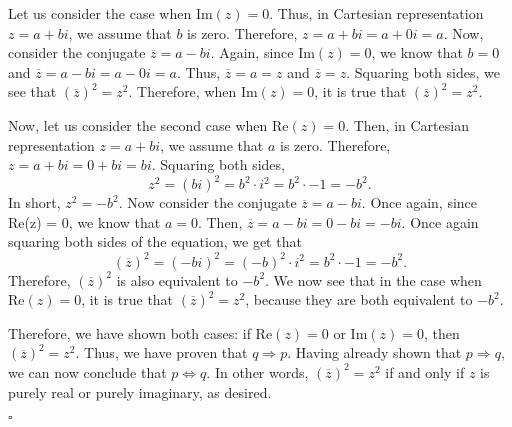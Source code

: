 \documentclass[12pt]{exam}
\begin{document}
\begin{questions}
\begin{parts}
\par
Let us consider the case when $\textrm{Im}(z) = 0$. Thus, in Cartesian representation $z = a + bi$, we assume that $b$ is zero. Therefore, $z = a + bi = a + 0i = a$. Now, consider the conjugate $\overline z = a - bi$. Again, since $\textrm{Im}(z) = 0$, we know that $b=0$ and $\overline z = a - bi = a - 0i = a$. Thus, $\overline z = a = z$ and $\overline z = z$. Squaring both sides, we see that $\left(\overline z\right)^2 = z^2$. Therefore, when $\textrm{Im}(z) = 0$, it is true that $\left(\overline z\right)^2 = z^2$.
\par 
Now, let us consider the second case when $\textrm{Re}(z) = 0$. Then, in Cartesian representation $z = a + bi$, we assume that $a$ is zero. Therefore, $z = a + bi = 0 + bi = bi$. Squaring both sides, 
\begin{equation*}
z^2 = (bi)^2 = b^2 \cdot i^2 = b^2 \cdot -1 = -b^2. 
\end{equation*}
In short, $z^2 = -b^2$. Now consider the conjugate $\overline z = a - bi$. Once again, since Re(z) = 0, we know that $a = 0$. Then, $\overline z = a - bi = 0 - bi = -bi$. Once again squaring both sides of the equation, we get that 
\begin{equation*}
\left(\overline z\right)^2 = (-bi)^2 = (-b)^2 \cdot i^2 = b^2 \cdot -1 = -b^2. 
\end{equation*}
Therefore, $\left(\overline z\right)^2$ is also equivalent to $-b^2$. We now see that in the case when $\textrm{Re}(z) = 0$, it is true that $\left(\overline z\right)^2 = z^2$, because they are both equivalent to $-b^2$.
\par
Therefore, we have shown both cases: if $\textrm{Re}(z) = 0$ or $\textrm{Im}(z) = 0$, then $\left(\overline z\right)^2 = z^2$. Thus, we have proven that  $q \Rightarrow p$. Having already shown that $p \Rightarrow q$, we can now conclude that $p \Leftrightarrow q$. In other words, $\left(\overline z\right)^2 = z^2$ if and only if $z$ is purely real or purely imaginary, as desired.
\begin{flushright}
$\square$
\end{flushright}
\end{parts}

\question
\begin{parts}

\end{parts}
\end{questions}
\end{document}
